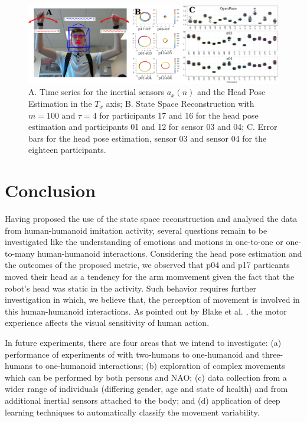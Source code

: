 \documentclass{sigchi}
\begin{document}
\begin{figure}[!htb]
\centering
\includegraphics[width=1.00\textwidth]{figures/results/main/figv01}
\caption[PA]{
A. Time series for the inertial sensors $a_x(n)$ and the
Head Pose Estimation in the $T_x$ axis;
B. State Space Reconstruction with $m=100$ and $\tau=4$ for
participants 17 and 16 for the head pose estimation and
participants 01 and 12 for sensor 03 and 04;
C. Error bars for the head pose estimation, sensor 03 and sensor 04 for
the eighteen participants.}
\label{fig:main}
\end{figure}


\section{Conclusion}
Having proposed the use of the state space reconstruction and analysed the
data from human-humanoid imitation activity, several questions remain
to be investigated like the understanding of emotions and motions
in one-to-one or one-to-many human-humanoid interactions.
Considering the head pose estimation and the outcomes of the proposed metric,
we observed that p04 and p17 particants moved their head as a tendency for
the arm momvement given the fact that the robot's head was static in the
activity.
Such behavior requires further investigation in which, we believe that,
the perception of movement is involved in this human-humanoid interactions.
As pointed out by Blake et al. \cite{blake2007}, the motor experience affects
the visual sensitivity of human action.

In future experiments, there are four areas that we intend to investigate:
(a) performance of experiments of with two-humans to one-humanoid and
 three-humans to one-humanoid interactions;
(b) exploration of complex movements which can be performed by both persons and NAO;
(c) data collection from a wider range of individuals
(differing gender, age and state of health) and from additional inertial sensors
attached to the body; and
(d) application of deep learning techniques to automatically classify the
movement variability.
\end{document}
